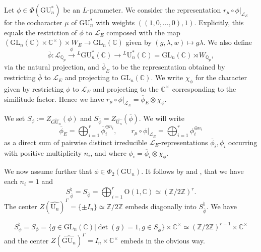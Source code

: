 \documentclass[reqno,11pt]{amsart}
\theoremstyle{remark}
\newcommand{\GU}{\mathrm{GU}}
\newcommand{\U}{\mathrm{U}}
\newcommand{\C}{\mathbb{C}}
\newcommand{\GL}{\mathrm{GL}}
\newcommand{\mc}{\mathcal}
\newcommand{\Q}{\mathbb{Q}}
\newcommand{\ov}{\overline}
\def\ra{\rightarrow}
\begin{document}
Let $\phi \in \Phi(\GU^*_n)$ be an $L$-parameter. We consider the representation $r_{\mu} \circ \phi|_{\mc{L}_E}$ for the cocharacter $\mu$ of $\GU^*_n$ with weights $((1,0, \dots, 0),1)$. Explicitly, this equals the restriction of $\phi$ to $\mc{L}_{E}$ composed with the map $(\GL_{n}(\mathbb{C}) \times \mathbb{C}^{\times}) \times W_{E}  \ra \GL_{n}(\mathbb{C})$ given by $(g,\lambda, w) \mapsto g\lambda$.
We also define \[ \overline{\phi}: \mc{L}_{\Q_p} \xrightarrow{\phi}  \phantom{}^{L}\GU^*_{n}(\mathbb{C}) \rightarrow \phantom{}^{L}\U^*_{n}(\mathbb{C}) = \GL_{n}(\mathbb{C}) \rtimes W_{\mathbb{Q}_{p}}, \]
via the natural projection, and $\overline{\phi}_{E}$ to be the representation obtained by restricting $\overline{\phi}$ to $\mc{L}_{E}$ and projecting to $\GL_{n}(\mathbb{C})$. We write $\chi_{\phi}$ for the character given by restricting $\phi$ to $\mc{L}_E$ and projecting to the $\C^{\times}$ corresponding to the similitude factor. Hence we have $r_{\mu} \circ \phi|_{\mc{L}_E} = \ov{\phi}_E \otimes \chi_{\phi}$. 

We set $S_{\phi} := Z_{\widehat{\GU_n}}(\phi)$ and $S_{\overline{\phi}} = Z_{\widehat{\U_n}}(\ov{\phi})$. We will write 
\[ \overline{\phi}_{E} = \bigoplus_{i = 1}^{r} \ov{\phi}_{i}^{\oplus n_{i}}, \quad \quad  r_{\mu} \circ \phi|_{\mathcal{L}_{E}} = \bigoplus_{i = 1}^{r} \phi_{i}^{\oplus n_{i}} \]
as a direct sum of pairwise distinct irreducible $\mathcal{L}_{E}$-representations $\ov{\phi}_{i}, \phi_i $ occurring with positive multiplicity $n_{i}$, and where $\phi_i = \ov{\phi}_i \otimes \chi_{\phi}$.

We now assume further that $\phi \in \Phi_2(\GU_n)$. It follows by \cite[Pages~62,63]{KMSW} and \cite[Lemma~10.3.1]{KottwitzCuspidal}, that we have each $n_i=1$ and
\[ S^{\natural}_{\ov{\phi}} = S_{\overline{\phi}} = \bigoplus_{i = 1}^{r} \mathrm{O}(1,\mathbb{C}) \simeq (\mathbb{Z}/2\mathbb{Z})^{r}. \]
The center $Z(\hat{\U_{n}})^{\Gamma} = \{\pm I_{n}\} \simeq \mathbb{Z}/2\mathbb{Z}$ embeds diagonally into $S^{\natural}_{\ov{\phi}}$.
We have

\[ S^{\natural}_{\phi} = S_{\phi} = \{g \in \GL_n(\C) | \det(g) = 1, g \in S_{\ov{\phi}}\} \times \C^{\times} \simeq (\mathbb{Z}/2\mathbb{Z})^{r - 1} \times \mathbb{C}^{\times} \]
and the center $Z(\widehat{\GU_{n}})^{\Gamma} = I_{n} \times \mathbb{C}^{\times}$ embeds in the obvious way.
\end{document}
